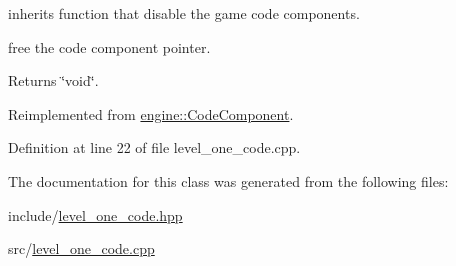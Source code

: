 inherits function that disable the game code components. 

free the code component pointer.

\begin{DoxyReturn}{Returns}
\char`\"{}void\char`\"{}. 
\end{DoxyReturn}


Reimplemented from \hyperlink{classengine_1_1_code_component_af76ba17f9f87216418081d1e2c7c3a22}{engine\+::\+Code\+Component}.



Definition at line 22 of file level\+\_\+one\+\_\+code.\+cpp.



The documentation for this class was generated from the following files\+:\begin{DoxyCompactItemize}
\item 
include/\hyperlink{level__one__code_8hpp}{level\+\_\+one\+\_\+code.\+hpp}\item 
src/\hyperlink{level__one__code_8cpp}{level\+\_\+one\+\_\+code.\+cpp}\end{DoxyCompactItemize}
